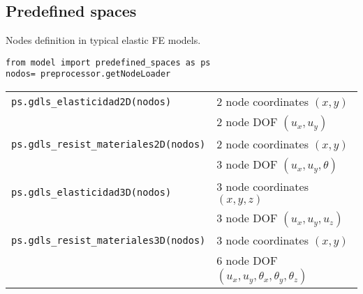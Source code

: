 \subsection{Predefined spaces}
Nodes definition in typical elastic FE models.
\begin{verbatim}
from model import predefined_spaces as ps
nodos= preprocessor.getNodeLoader
\end{verbatim}
\begin{center} 
\begin{longtable}{ll}
{\tt ps.gdls\_elasticidad2D(nodos)} & 2 node coordinates $(x,y)$ \\
                                    & 2 node DOF $(u_x,u_y)$ \\ 
{\tt ps.gdls\_resist\_materiales2D(nodos)} & 2 node coordinates $(x,y)$ \\
                                    & 3 node DOF $(u_x,u_y,\theta)$ \\ 
{\tt ps.gdls\_elasticidad3D(nodos)} & 3 node coordinates $(x,y,z)$ \\
                                    & 3 node DOF $(u_x,u_y,u_z)$ \\ 
{\tt ps.gdls\_resist\_materiales3D(nodos)} & 3 node coordinates $(x,y)$ \\
                                    & 6 node DOF $(u_x,u_y,\theta_x,\theta_y,\theta_z)$ \\ 
\end{longtable} \end{center}

